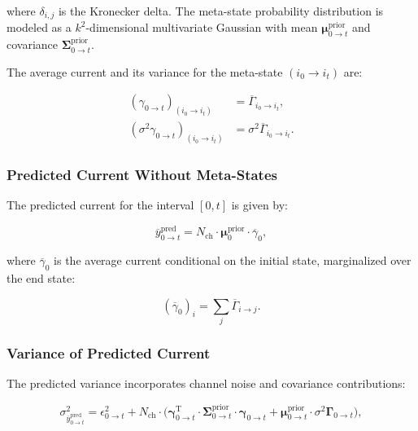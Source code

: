 \documentclass[pdflatex,sn-mathphys-num]{sn-jnl}%
\theoremstyle{thmstyleone}%
\theoremstyle{thmstyletwo}%
\theoremstyle{thmstylethree}%
\begin{document}
where \( \delta_{i, j} \) is the Kronecker delta. The meta-state probability distribution is modeled as a \( k^2 \)-dimensional multivariate Gaussian with mean \( \boldsymbol{\mu}^{\text{prior}}_{0 \rightarrow t} \) and covariance \( \boldsymbol{\Sigma}^{\text{prior}}_{0 \rightarrow t} \).

The average current and its variance for the meta-state \((i_0 \rightarrow i_t)\) are:

\begin{align}
	(\gamma_{0 \rightarrow t})_{(i_0 \rightarrow i_t)} &= \overline{\Gamma}_{i_0 \rightarrow i_t}, \label{eq:meta_gamma_prior} \\
	(\sigma^2 \gamma_{0 \rightarrow t})_{(i_0 \rightarrow i_t)} &= \sigma^2 \overline{\Gamma}_{i_0 \rightarrow i_t}. \label{eq:meta_sigma_gamma_prior}
\end{align}

\subsubsection{ Predicted Current Without Meta-States}

The predicted current for the interval \([0, t]\) is given by:

\begin{equation}
	\overline{y}^{\text{pred}}_{0 \rightarrow t} = N_{\text{ch}} \cdot \mathbf{\mu}^{\text{prior}}_0 \cdot \overline{\gamma}_0,
	\label{eq:macro_interval_predicted_y}
\end{equation}

where \( \overline{\gamma}_0 \) is the average current conditional on the initial state, marginalized over the end state:

\begin{equation}
	(\overline{\gamma}_0)_i = \sum_j \overline{\Gamma}_{i \rightarrow j}.
	\label{eq:macro_gamma_marginal}
\end{equation}

\subsubsection{Variance of Predicted Current}

The predicted variance incorporates channel noise and covariance contributions:

\begin{equation}
	\sigma^2_{\overline{y}^{\text{pred}}_{0 \rightarrow t}} = \epsilon^2_{0 \rightarrow t} + N_{\text{ch}} \cdot \big( \mathbf{\gamma}_{0 \rightarrow t}^\mathrm{T} \cdot \mathbf{\Sigma}^{\text{prior}}_{0 \rightarrow t} \cdot \mathbf{\gamma}_{0 \rightarrow t} + \mathbf{\mu}^{\text{prior}}_{0 \rightarrow t} \cdot \sigma^2 \mathbf{\Gamma}_{0 \rightarrow t} \big),
	\label{eq:meta_macro_sigma_pred}
\end{equation}
\end{document}

